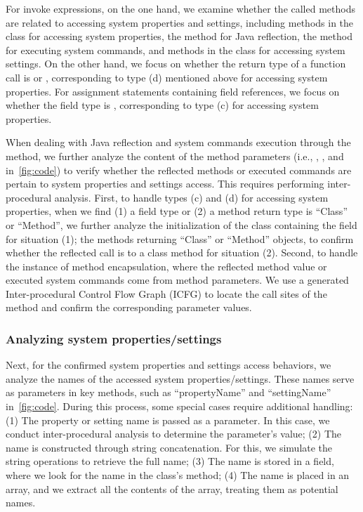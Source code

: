 For invoke expressions, on the one hand, we examine whether the called methods are related to accessing system properties and settings, including methods in the \texttt{} class for accessing system properties, the \texttt{} method for Java reflection, the \texttt{} method for executing system commands, and methods in the \texttt{} class for accessing system settings.
On the other hand, we focus on whether the return type of a function call is \texttt{} or \texttt{}, corresponding to type (d) mentioned above for accessing system properties.
For assignment statements containing field references, we focus on whether the field type is \texttt{}, corresponding to type (c) for accessing system properties.

When dealing with Java reflection and system commands execution through the \texttt{} method, we further analyze the content of the method parameters (i.e., , , and  in~\autoref{fig:code}) to verify whether the reflected methods or executed commands are pertain to system properties and settings access.
This requires performing inter-procedural analysis. 
First, to handle types (c) and (d) for accessing system properties, when we find (1) a field type or (2) a method return type is ``Class'' or ``Method'', we further analyze the initialization of the class containing the field for situation (1); the methods returning ``Class'' or ``Method'' objects, to confirm whether the reflected call is to a \texttt{} class method for situation (2).
Second, to handle the instance of method encapsulation, where the reflected method value or executed system commands come from method parameters. 
We use a generated Inter-procedural Control Flow Graph (ICFG) to locate the call sites of the method and confirm the corresponding parameter values.

\subsubsection{Analyzing system properties/settings}
Next, for the confirmed system properties and settings access behaviors, we analyze the names of the accessed system properties/settings. 
These names serve as parameters in key methods, such as ``propertyName'' and ``settingName'' in~\autoref{fig:code}.
During this process, some special cases require additional handling: (1) The property or setting name is passed as a parameter. 
In this case, we conduct inter-procedural analysis to determine the parameter's value; 
(2) The name is constructed through string concatenation. 
For this, we simulate the string operations to retrieve the full name; 
(3) The name is stored in a field, where we look for the name in the class's \texttt{} method; 
(4) The name is placed in an array, and we extract all the contents of the array, treating them as potential names.

